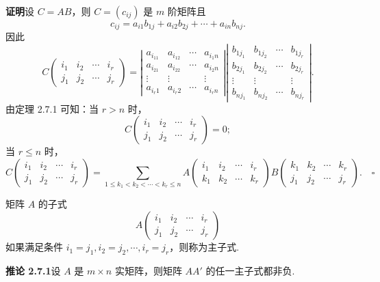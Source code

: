 \documentclass[UTF8, 12pt, fontset=fandol, oneside]{ctexart}
\begin{document}
\noindent\textbf{证明}\quad 设 $C=AB$，则 $C=(c_{ij})$ 是 $m$ 阶矩阵且
\[
c_{ij}=a_{i1}b_{1j}+a_{i2}b_{2j}+\cdots+a_{in}b_{nj}.
\]
因此
\[
C\left(\begin{array}{cccc}
i_1 & i_2 & \cdots & i_r\\
j_1 & j_2 & \cdots & j_r
\end{array}\right)=
\left|\begin{array}{cccc}
a_{i_11} & a_{i_12} & \cdots & a_{i_1n}\\
a_{i_21} & a_{i_22} & \cdots & a_{i_2n}\\
\vdots & \vdots & & \vdots\\
a_{i_r1} & a_{i_r2} & \cdots & a_{i_rn}
\end{array}\right|
\left|\begin{array}{cccc}
b_{1j_1} & b_{1j_2} & \cdots & b_{1j_r}\\
b_{2j_1} & b_{2j_2} & \cdots & b_{2j_r}\\
\vdots & \vdots & & \vdots\\
b_{nj_1} & b_{nj_2} & \cdots & b_{nj_r}
\end{array}\right|.
\]
由定理 2.7.1 可知：当 $r>n$ 时，
\[
C\left(\begin{array}{cccc}
i_1 & i_2 & \cdots & i_r\\
j_1 & j_2 & \cdots & j_r
\end{array}\right)=0;
\]
当 $r\leq n$ 时，
\[
C\left(\begin{array}{cccc}
i_1 & i_2 & \cdots & i_r\\
j_1 & j_2 & \cdots & j_r
\end{array}\right)
=\sum_{1\leq k_1<k_2<\cdots<k_r\leq n}
A\left(\begin{array}{cccc}
i_1 & i_2 & \cdots & i_r\\
k_1 & k_2 & \cdots & k_r
\end{array}\right)
B\left(\begin{array}{cccc}
k_1 & k_2 & \cdots & k_r\\
j_1 & j_2 & \cdots & j_r
\end{array}\right). \quad \square
\]

矩阵 $A$ 的子式
\[
A\left(\begin{array}{cccc}
i_1 & i_2 & \cdots & i_r\\
j_1 & j_2 & \cdots & j_r
\end{array}\right)
\]
如果满足条件 $i_1=j_1,i_2=j_2,\cdots,i_r=j_r$，则称为主子式.

\noindent\textbf{推论 2.7.1}\quad 设 $A$ 是 $m\times n$ 实矩阵，则矩阵 $AA'$ 的任一主子式都非负.
\end{document}
